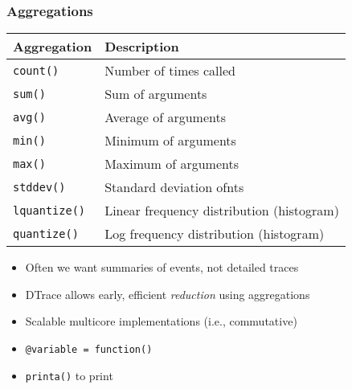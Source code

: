 \begin{frame}
  \frametitle{Aggregations}

  \begin{center}
    \begin{small}
      \begin{tabular}{ll}
        \hline
        Aggregation & Description \\
        \hline
	\texttt{count()} & Number of times called \\
	\texttt{sum()} & Sum of arguments \\
	\texttt{avg()} & Average of arguments \\
	\texttt{min()} & Minimum of arguments \\
	\texttt{max()} & Maximum of arguments \\
	\texttt{stddev()} & Standard deviation ofnts \\
	\texttt{lquantize()} & Linear frequency distribution (histogram) \\
	\texttt{quantize()} & Log frequency distribution (histogram) \\
        \hline
      \end{tabular}
    \end{small}
  \end{center}
  \begin{itemize}
    \item Often we want summaries of events, not detailed traces
    \item DTrace allows early, efficient \textit{reduction} using aggregations
    \item Scalable multicore implementations (i.e., commutative)
    \item \texttt{@variable = function()}
    \item \texttt{printa()} to print
  \end{itemize}

\end{frame}

